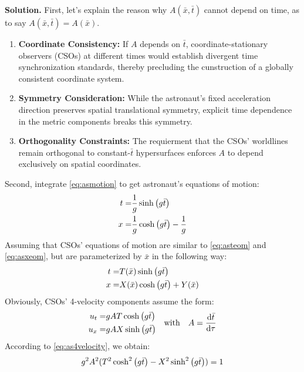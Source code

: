\documentclass[12pt, a4paper, oneside]{article}
\newenvironment{solution}{\par\noindent\textbf{Solution. }}{\par}
\begin{document}
\begin{solution}
    First, let's explain the reason why $A(\bar{x}, \bar{t})$ cannot depend on time, as to say $A(\bar{x}, \bar{t})=A(\bar{x})$. 
    \begin{enumerate}
        \item \textbf{Coordinate Consistency:} If $A$ depends on $\bar{t}$, coordinate-stationary observers (CSOs) at different times would establish divergent time synchronization standards, thereby precluding the cunstruction of a globally consistent coordinate system.
        \item \textbf{Symmetry Consideration:} While the astronaut's fixed acceleration direction preserves spatial translational symmetry, explicit time dependence in the metric components breaks this symmetry.
        \item \textbf{Orthogonality Constraints:} The requierment that the CSOs' worldlines remain orthogonal to constant-$\bar{t}$ hypersurfaces enforces $A$ to depend exclusively on spatial coordinates.
    \end{enumerate}
    Second, integrate \cref{eq:asmotion} to get astronaut's equations of motion:
    \begin{align}
        t =& \frac{1}{g}\sinh\qty(g\bar{t})\label{eq:asteom}\\
        x =& \frac{1}{g}\cosh\qty(g\bar{t})-\frac{1}{g}\label{eq:asxeom}
    \end{align}
    Assuming that CSOs' equations of motion are similar to \cref{eq:asteom} and \cref{eq:asxeom}, but are parameterized by $\bar{x}$ in the following way:
    \begin{align}
        t =& T\qty(\bar{x})\sinh\qty(g\bar{t})\label{eq:csointeom}\\
        x =& X\qty(\bar{x})\cosh\qty(g\bar{t})+Y\qty(\bar{x})\label{eq:csoinxeom}
    \end{align}
    Obviously, CSOs' 4-velocity components assume the form:
    \begin{equation}
        \begin{split}
            u_t =& gAT\cosh\qty(g\bar{t})\\
            u_x =& gAX\sinh\qty(g\bar{t})
        \end{split}
        \quad \text{with} \quad A=\dv{\bar{t}}{\tau}
    \end{equation}
    According to \cref{eq:as4velocity}, we obtain:
    \begin{equation}
        \begin{split}
            &g^2A^2(T^2\cosh^2\qty(g\bar{t})-X^2\sinh^2\qty(g\bar{t}))=1\\

\end{split}
\end{equation}
\end{solution}
\end{document}
